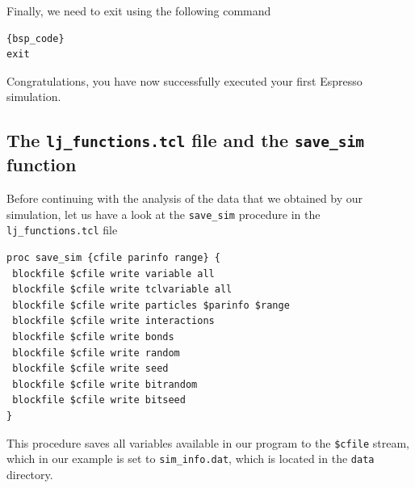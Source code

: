 \documentclass[
paper=a4,                       %
fontsize=11pt,                  %
twoside,                        %
footsepline,                    %
headsepline,                    %
headinclude=false,              %
footinclude=false,              %
pagesize,                       %
]{scrartcl}
\newtheorem{task}{Task}
\begin{document}
\noindent Finally, we need to exit \es{} using the following command

{\small\vspace{0,2cm}
\begin{lstlisting}[firstnumber=auto]{bsp_code}
exit
\end{lstlisting}\vspace{0,2cm}
}

\noindent Congratulations, you have now successfully executed your first Espresso simulation. 

\subsection{The \texttt{lj\_functions.tcl} file and the \lstinline|save_sim| function}

Before continuing with the analysis of the data that we obtained by our simulation, let us have a look at the \lstinline|save_sim| procedure in the \texttt{lj\_functions.tcl} file

{\small\vspace{0,2cm}
\begin{lstlisting}[numbers=none]
proc save_sim {cfile parinfo range} {
 blockfile $cfile write variable all
 blockfile $cfile write tclvariable all
 blockfile $cfile write particles $parinfo $range
 blockfile $cfile write interactions
 blockfile $cfile write bonds
 blockfile $cfile write random
 blockfile $cfile write seed
 blockfile $cfile write bitrandom
 blockfile $cfile write bitseed
}
\end{lstlisting}\vspace{0,2cm}
}

\noindent 
This procedure saves all variables available in our program to the \lstinline|$cfile| stream, which in our example is set to \texttt{sim\_info.dat}, which is located in the \texttt{data} directory. 

\vspace{1cm}
\vspace{1cm}
\end{document}
